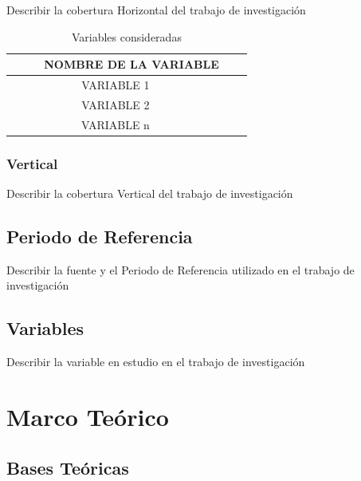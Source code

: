 \documentclass[oneside,11pt]{Latex/Classes/PhDthesisPSnPDF}
\begin{document}
Describir la cobertura Horizontal del trabajo de investigación\\

\begin{table}[ht]
\centering
\caption{Variables consideradas} 
\resizebox{10cm}{!} {
\begin{tabular}{ccc}
  \hline
\ \ \ \ \ NOMBRE DE LA VARIABLE \\ 
  \hline
   VARIABLE 1 \\ 
VARIABLE 2\\ 
VARIABLE n\\ 
   \hline
\end{tabular}
}
\end{table}

\subsection{Vertical}

Describir la cobertura Vertical del trabajo de investigación

\section{Periodo de Referencia}

Describir la fuente y el Periodo de Referencia utilizado en el trabajo
de investigación

\section{Variables}

Describir la variable en estudio en el trabajo de investigación

\chapter{Marco Teórico}

\section{Bases Teóricas}
\end{document}

